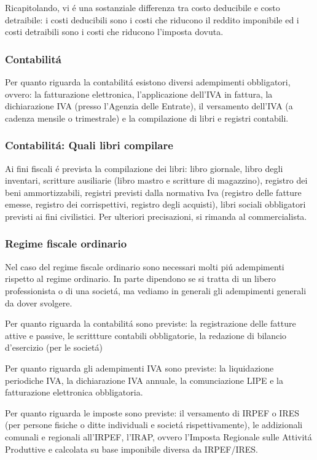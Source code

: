 \documentclass{article}
\begin{document}
Ricapitolando, vi \'e una sostanziale differenza tra costo deducibile e costo detraibile: i costi deducibili sono i costi che riducono il reddito imponibile ed i costi detraibili sono i costi che riducono l'imposta dovuta.

\subsubsection{Contabilit\'a}
Per quanto riguarda la contabilit\'a esistono diversi adempimenti obbligatori, ovvero: la fatturazione elettronica, l'applicazione dell'IVA in fattura, la dichiarazione IVA (presso l'Agenzia delle Entrate), il versamento dell'IVA (a cadenza mensile o trimestrale)
e la compilazione di libri e registri contabili.

\subsubsection{Contabilit\'a: Quali libri compilare}
Ai fini fiscali \'e prevista la compilazione dei libri: libro giornale, 
libro degli inventari, 
scritture ausiliarie (libro mastro e scritture di magazzino), 
registro dei beni ammortizzabili, 
registri previsti dalla normativa Iva (registro delle fatture emesse, registro dei corrispettivi, registro degli acquisti), 
libri sociali obbligatori previsti ai fini civilistici.
Per ulteriori precisazioni, si rimanda al commercialista.

\subsubsection{Regime fiscale ordinario}
Nel caso del regime fiscale ordinario sono necessari molti pi\'u adempimenti rispetto al regime ordinario. In parte dipendono se si tratta di un libero professionista o di una societ\'a, ma vediamo in generali gli adempimenti generali da dover svolgere.

Per quanto riguarda la contabilit\'a sono previste:
la registrazione delle fatture attive e passive,
le scrittture contabili obbligatorie,
la redazione di bilancio d'esercizio (per le societ\'a)

Per quanto riguarda gli adempimenti IVA sono previste:
la liquidazione periodiche IVA,
la dichiarazione IVA annuale,
la comunciazione LIPE e 
la fatturazione elettronica obbligatoria.

Per quanto riguarda le imposte sono previste:
il versamento di IRPEF o IRES (per persone fisiche o ditte individuali e societ\'a rispettivamente),
le addizionali comunali e regionali all'IRPEF,
l'IRAP, ovvero l'Imposta Regionale sulle Attivit\'a Produttive e calcolata su base imponibile diversa da IRPEF/IRES.
\end{document}
